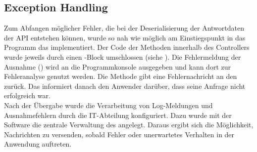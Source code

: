 \subsection{Exception Handling}
\label{sec:ExceptionHandling}
Zum Abfangen möglicher Fehler, die \zB bei der Deserialisierung der Antwortdaten 
der \acs{API} entstehen können, wurde so nah wie möglich am Einstiegspunkt in das 
Programm das  implementiert. Der Code der Methoden 
innerhalb des Controllers  wurde jeweils durch einen
-Block umschlossen (siehe ). 
Die Fehlermeldung der Ausnahme () wird an die Programmkonsole ausgegeben 
und kann dort zur Fehleranalyse genutzt werden. Die Methode gibt eine Fehlernachricht an den 
 zurück. Das  informiert danach
den Anwender darüber, dass seine Anfrage nicht erfolgreich war.\\
Nach der Übergabe wurde die Verarbeitung von Log-Meldungen und Ausnahmefehlern
durch die IT-Abteilung konfiguriert. Dazu wurde mit der Software 
die zentrale Verwaltung des  angelegt. Daraus ergibt sich die 
Möglichkeit, Nachrichten zu versenden, sobald Fehler oder unerwartetes Verhalten
in der Anwendung auftreten.

